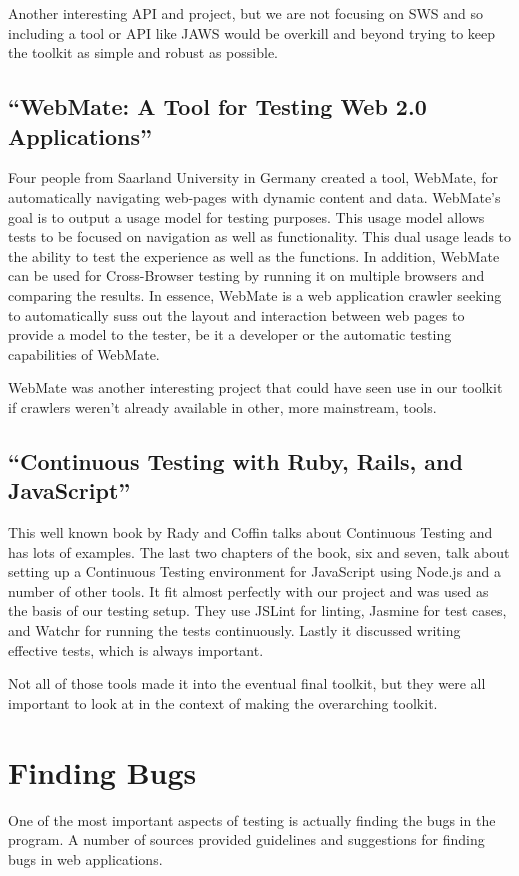 \documentclass[12pt]{ucthesis}
\begin{document}
Another interesting API and project, but we are not focusing on SWS and so including a tool or API like JAWS would be overkill and beyond trying to keep the toolkit as simple and robust as possible.

\subsection{``WebMate: A Tool for Testing Web 2.0 Applications''}
Four people from Saarland University in Germany created a tool, WebMate, for automatically navigating web-pages with dynamic content and data\cite{WebMate}. WebMate's goal is to output a usage model for testing purposes. This usage model allows tests to be focused on navigation as well as functionality. This dual usage leads to the ability to test the experience as well as the functions. In addition, WebMate can be used for Cross-Browser testing by running it on multiple browsers and comparing the results. In essence, WebMate is a web application crawler seeking to automatically suss out the layout and interaction between web pages to provide a model to the tester, be it a developer or the automatic testing capabilities of WebMate.

WebMate was another interesting project that could have seen use in our toolkit if crawlers weren't already available in other, more mainstream, tools.

\subsection{``Continuous Testing with Ruby, Rails, and JavaScript''}
This well known book by Rady and Coffin\cite{BookContinuousTesting} talks about Continuous Testing and has lots of examples. The last two chapters of the book, six and seven, talk about setting up a Continuous Testing environment for JavaScript using Node.js and a number of other tools. It fit almost perfectly with our project and was used as the basis of our testing setup. They use JSLint for linting, Jasmine for test cases, and Watchr for running the tests continuously. Lastly it discussed writing effective tests, which is always important.

Not all of those tools made it into the eventual final toolkit, but they were all important to look at in the context of making the overarching toolkit.

\section{Finding Bugs}
One of the most important aspects of testing is actually finding the bugs in the program. A number of sources provided guidelines and suggestions for finding bugs in web applications.
\end{document}
